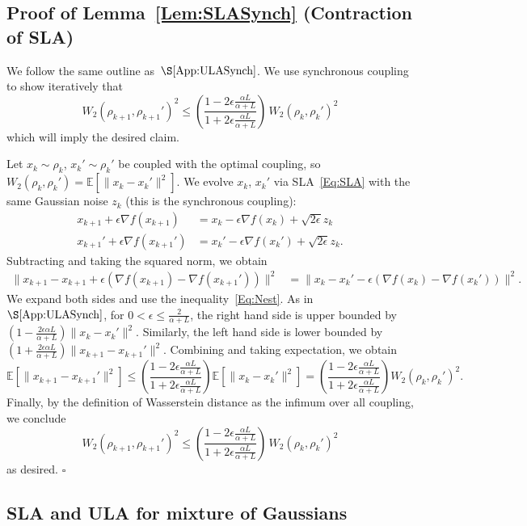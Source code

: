 \documentclass[final,12pt]{colt2018}
\newcommand{\E}{\mathbb{E}}
\begin{document}
\subsection{Proof of Lemma~\ref{Lem:SLASynch} (Contraction of SLA)}
\label{App:SLASynch}

We follow the same outline as~$\S\ref{App:ULASynch}$.
We use synchronous coupling to show iteratively that
$$W_2(\rho_{k+1},\rho_{k+1}')^2 \le \left(\frac{1-2\epsilon\frac{\alpha L}{\alpha+L}}{1+2\epsilon\frac{ \alpha L}{\alpha+L}}\right) \, W_2(\rho_k,\rho_k')^2$$
which will imply the desired claim.

Let $x_k \sim \rho_k$, $x_k' \sim \rho_k'$ be coupled with the optimal coupling, so $W_2(\rho_k,\rho_k') = \E[\|x_k-x_k'\|^2]$.
We evolve $x_k$, $x_k'$ via SLA~\eqref{Eq:SLA} with the same Gaussian noise $z_k$ (this is the synchronous coupling):
\begin{align*}
x_{k+1} + \epsilon \nabla f(x_{k+1}) &= x_k - \epsilon \nabla f(x_k) + \sqrt{2\epsilon} z_k \\
x_{k+1}' + \epsilon \nabla f(x_{k+1}') &= x_k' - \epsilon \nabla f(x_k') + \sqrt{2\epsilon} z_k.
\end{align*}
Subtracting and taking the squared norm, we obtain
\begin{align*}
\|x_{k+1}-x_{k+1} + \epsilon (\nabla f(x_{k+1}) - \nabla f(x_{k+1}')) \|^2 &= \|x_k - x_k' - \epsilon (\nabla f(x_k) - \nabla f(x_k'))\|^2.
\end{align*}
We expand both sides and use the inequality~\eqref{Eq:Nest}.
As in~$\S\ref{App:ULASynch}$, for $0 < \epsilon \le \frac{2}{\alpha+L}$, the right hand side is upper bounded by $(1-\frac{2\epsilon \alpha L}{\alpha+L}) \|x_k-x_k'\|^2$.
Similarly, the left hand side is lower bounded by $(1+\frac{2\epsilon \alpha L}{\alpha+L}) \|x_{k+1}-x_{k+1}'\|^2$.
Combining and taking expectation, we obtain
$$\E[\|x_{k+1}-x_{k+1}'\|^2] \le \left(\frac{1-2\epsilon\frac{\alpha L}{\alpha+L}}{1+2\epsilon\frac{ \alpha L}{\alpha+L}}\right) \E[\|x_k-x_k'\|^2] = \left(\frac{1-2\epsilon\frac{\alpha L}{\alpha+L}}{1+2\epsilon\frac{ \alpha L}{\alpha+L}}\right) W_2(\rho_k,\rho_k')^2.$$
Finally, by the definition of Wasserstein distance as the infimum over all coupling, we conclude
$$W_2(\rho_{k+1},\rho_{k+1}')^2 \le \left(\frac{1-2\epsilon\frac{\alpha L}{\alpha+L}}{1+2\epsilon\frac{ \alpha L}{\alpha+L}}\right) \, W_2(\rho_k,\rho_k')^2$$
as desired.
\hfill $\square$


\subsection{SLA and ULA for mixture of Gaussians}
\label{App:MG}
\end{document}
